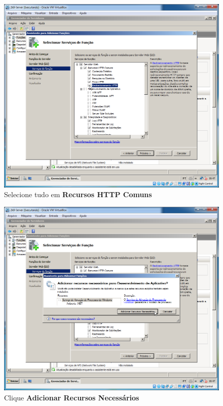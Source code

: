 \documentclass[10pt]{article}
\begin{document}
\begin{figure}[H]
    \centering
    \caption{Selecione tudo em \textbf{Recursos HTTP Comuns}}
    \label{fig:IIS011}
    \includegraphics[width=\linewidth]{images/IIS/IIS011.png}
\end{figure}
\begin{figure}[H]
    \centering
    \caption{Clique \textbf{Adicionar Recursos Necessários}}
    \label{fig:IIS013}
    \includegraphics[width=\linewidth]{images/IIS/IIS013.png}
\end{figure}
\end{document}
